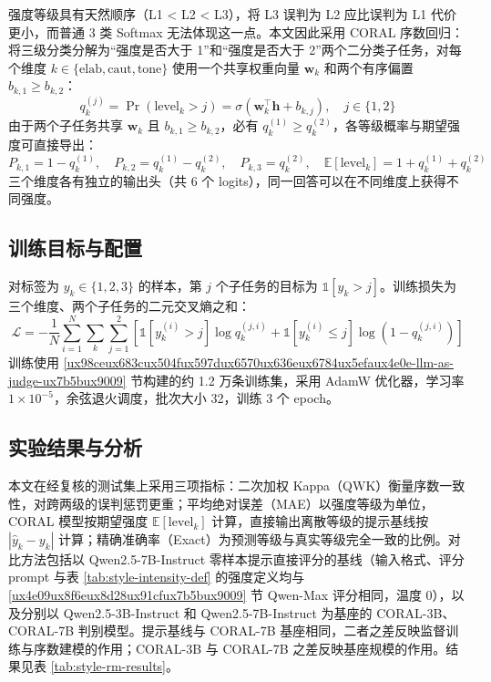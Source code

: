 \documentclass[fontset=fandol,type=master,campus=shenzhen,etitleauto=true]{hithesisbook}
\begin{document}
强度等级具有天然顺序（L1 < L2 < L3），将 L3 误判为 L2 应比误判为 L1 代价更小，而普通 3 类 Softmax 无法体现这一点。本文因此采用 CORAL 序数回归\cite{ref86}：将三级分类分解为“强度是否大于 1”和“强度是否大于 2”两个二分类子任务，对每个维度 $k \in \{\text{elab}, \text{caut}, \text{tone}\}$ 使用一个共享权重向量 $\mathbf{w}_k$ 和两个有序偏置 $b_{k,1} \ge b_{k,2}$：
\begin{equation}
q_k^{(j)} = \Pr(\text{level}_k > j) = \sigma\!\left(\mathbf{w}_k^{\top}\mathbf{h} + b_{k,j}\right), \quad j \in \{1, 2\}
\end{equation}
由于两个子任务共享 $\mathbf{w}_k$ 且 $b_{k,1} \ge b_{k,2}$，必有 $q_k^{(1)} \ge q_k^{(2)}$，各等级概率与期望强度可直接导出：
\begin{equation}
P_{k,1} = 1 - q_k^{(1)}, \quad P_{k,2} = q_k^{(1)} - q_k^{(2)}, \quad P_{k,3} = q_k^{(2)}, \quad \mathbb{E}[\text{level}_k] = 1 + q_k^{(1)} + q_k^{(2)}
\end{equation}
三个维度各有独立的输出头（共 6 个 logits），同一回答可以在不同维度上获得不同强度。

\subsection{训练目标与配置}\label{ux8badux7ec3ux76eeux6807ux4e0eux4f18ux5316ux914dux7f6e-1}

对标签为 $y_k \in \{1,2,3\}$ 的样本，第 $j$ 个子任务的目标为 $\mathbb{1}[y_k > j]$。训练损失为三个维度、两个子任务的二元交叉熵之和：
\begin{equation}
\mathcal{L} = -\frac{1}{N}\sum_{i=1}^{N} \sum_{k} \sum_{j=1}^{2} \left[ \mathbb{1}[y_k^{(i)} > j] \log q_k^{(j,i)} + \mathbb{1}[y_k^{(i)} \le j] \log\!\left(1 - q_k^{(j,i)}\right) \right]
\end{equation}
训练使用 \ref{ux98ceux683cux504fux597dux6570ux636eux6784ux5efaux4e0e-llm-as-judge-ux7b5bux9009} 节构建的约 1.2 万条训练集，采用 AdamW 优化器，学习率 $1 \times 10^{-5}$，余弦退火调度，批次大小 32，训练 3 个 epoch。

\subsection{实验结果与分析}\label{ux98ceux683cux5224ux522bux5b9eux9a8cux7ed3ux679c}

本文在经复核的测试集上采用三项指标：二次加权 Kappa（QWK）衡量序数一致性，对跨两级的误判惩罚更重；平均绝对误差（MAE）以强度等级为单位，CORAL 模型按期望强度 $\mathbb{E}[\text{level}_k]$ 计算，直接输出离散等级的提示基线按 $|\hat{y}_k - y_k|$ 计算；精确准确率（Exact）为预测等级与真实等级完全一致的比例。对比方法包括以 Qwen2.5-7B-Instruct 零样本提示直接评分的基线（输入格式、评分 prompt 与表 \ref{tab:style-intensity-def} 的强度定义均与 \ref{ux4e09ux8f6eux8d28ux91cfux7b5bux9009} 节 Qwen-Max 评分相同，温度 0），以及分别以 Qwen2.5-3B-Instruct 和 Qwen2.5-7B-Instruct 为基座的 CORAL-3B、CORAL-7B 判别模型。提示基线与 CORAL-7B 基座相同，二者之差反映监督训练与序数建模的作用；CORAL-3B 与 CORAL-7B 之差反映基座规模的作用。结果见表 \ref{tab:style-rm-results}。
\end{document}
